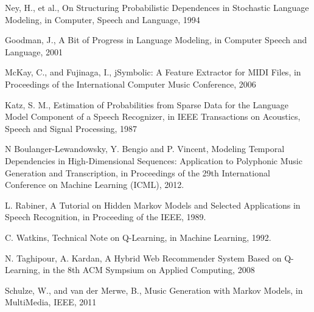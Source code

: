 \documentclass{article}
\begin{document}
\begin{thebibliography}{9}%

Ney, H., et al., On Structuring Probabilistic Dependences in Stochastic Language Modeling, in Computer, Speech and Language, 1994

Goodman, J., A Bit of Progress in Language Modeling, in Computer Speech and Language, 2001

McKay, C., and Fujinaga, I., jSymbolic: A Feature Extractor for MIDI Files, in Proceedings of the International Computer Music Conference, 2006

Katz, S. M., Estimation of Probabilities from Sparse Data for the Language Model Component of a Speech Recognizer, in IEEE Transactions on Acoustics, Speech and Signal Processing, 1987

N Boulanger-Lewandowsky, Y. Bengio and P. Vincent, Modeling Temporal Dependencies in High-Dimensional Sequences: Application to Polyphonic Music Generation and Transcription, in Proceedings of the 29th International Conference on Machine Learning (ICML), 2012.

L. Rabiner, A Tutorial on Hidden Markov Models and Selected Applications in Speech Recognition, in Proceeding of the IEEE, 1989.

C. Watkins, Technical Note on Q-Learning, in Machine Learning, 1992.

N. Taghipour, A. Kardan, A Hybrid Web Recommender System Based on Q-Learning, in the 8th ACM Sympsium on Applied Computing, 2008

Schulze, W., and van der Merwe, B., Music Generation with Markov Models, in MultiMedia, IEEE, 2011

\end{thebibliography}
\end{document}
